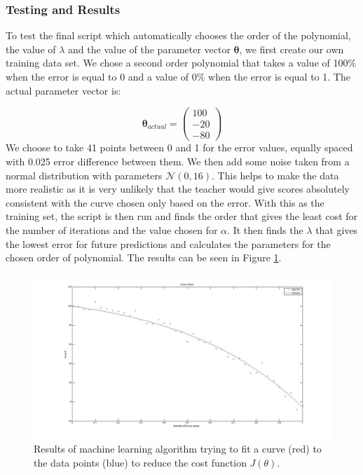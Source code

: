 \documentclass[11pt,a4paper]{article}
\begin{document}
\subsubsection{Testing and Results}
\noindent 
To test the final script which automatically chooses the order of the polynomial, the value of $\lambda$ and the value of the parameter vector $\boldsymbol \theta$, we first create our own training data set. We chose a second order polynomial that takes a value of 100\% when the error is equal to 0 and a value of 0\% when the error is equal to 1.
The actual parameter vector is:

\begin{equation}
\boldsymbol \theta_{actual} = 
\begin{pmatrix}
100\\
-20\\
-80
\end{pmatrix}
\end{equation}
We choose to take 41 points between 0 and 1 for the error values, equally spaced with 0.025 error difference between them. We then add some noise taken from a normal distribution with parameters $\mathcal{N}(0, 16)$. This helps to make the data more realistic as it is very unlikely that the teacher would give scores absolutely consistent with the curve chosen only based on the error. With this as the training set, the script is then run and finds the order that gives the least cost for the number of iterations and the value chosen for $\alpha$. It then finds the $\lambda$ that gives the lowest error for future predictions and calculates the parameters for the chosen order of polynomial. The results can be seen in Figure \ref{machine_learning_results}.

\begin{figure}[H]
\centering
\includegraphics[scale=0.3]{Score_Function_Machine_Learning.jpg}

\caption{Results of machine learning algorithm trying to fit a curve (red) to the data points (blue) to reduce the cost function $J(\theta)$.}
\label{machine_learning_results}
\end{figure}
\end{document}
